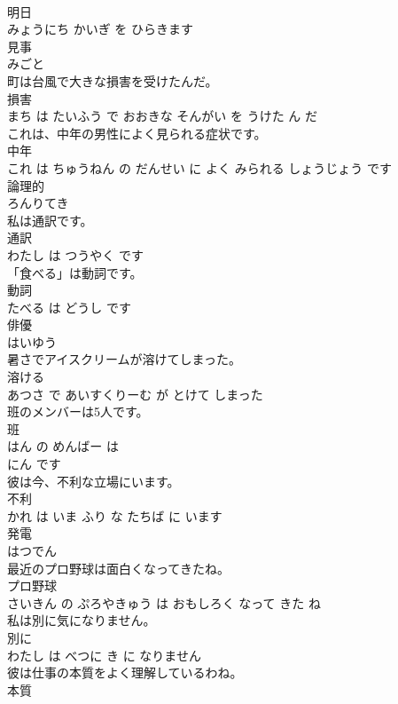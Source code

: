 \documentclass[8pt]{extreport}
\begin{document}
\begin{CJK}{UTF8}{min}
\\	明日 
\\	みょうにち かいぎ を ひらきます			
\\	見事	
\\	みごと		
\\	町は台風で大きな損害を受けたんだ。	
\\	損害 
\\	まち は たいふう で おおきな そんがい を うけた ん だ			
\\	これは、中年の男性によく見られる症状です。	
\\	中年 
\\	これ は ちゅうねん の だんせい に よく みられる しょうじょう です			
\\	論理的	
\\	ろんりてき		
\\	私は通訳です。	
\\	通訳 
\\	わたし は つうやく です			
\\	「食べる」は動詞です。	
\\	動詞 
\\	たべる は どうし です			
\\	俳優	
\\	はいゆう		
\\	暑さでアイスクリームが溶けてしまった。	
\\	溶ける 
\\	あつさ で あいすくりーむ が とけて しまった			
\\	班のメンバーは5人です。	
\\	班 
\\	はん の めんばー は 
\\	にん です			
\\	彼は今、不利な立場にいます。	
\\	不利 
\\	かれ は いま ふり な たちば に います			
\\	発電	
\\	はつでん		
\\	最近のプロ野球は面白くなってきたね。	
\\	プロ野球 
\\	さいきん の ぷろやきゅう は おもしろく なって きた ね			
\\	私は別に気になりません。	
\\	別に 
\\	わたし は べつに き に なりません			
\\	彼は仕事の本質をよく理解しているわね。	
\\	本質 

\end{CJK}
\end{document}
